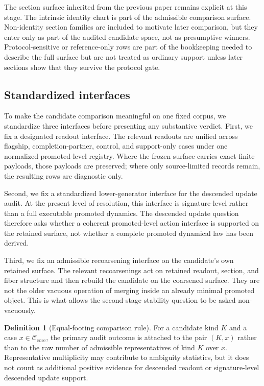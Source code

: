 \documentclass[11pt]{article}
\theoremstyle{definition}
\newtheorem{definition}[theorem]{Definition}
\begin{document}
The section surface inherited from the previous paper remains explicit at this stage. The intrinsic identity chart is part of the admissible comparison surface. Non-identity section families are included to motivate later comparison, but they enter only as part of the audited candidate space, not as presumptive winners. Protocol-sensitive or reference-only rows are part of the bookkeeping needed to describe the full surface but are not treated as ordinary support unless later sections show that they survive the protocol gate.

\subsection{Standardized interfaces}

To make the candidate comparison meaningful on one fixed corpus, we standardize three interfaces before presenting any substantive verdict. First, we fix a designated readout interface. The relevant readouts are unified across flagship, completion-partner, control, and support-only cases under one normalized promoted-level registry. Where the frozen surface carries exact-finite payloads, those payloads are preserved; where only source-limited records remain, the resulting rows are diagnostic only.

Second, we fix a standardized lower-generator interface for the descended update audit. At the present level of resolution, this interface is signature-level rather than a full executable promoted dynamics. The descended update question therefore asks whether a coherent promoted-level action interface is supported on the retained surface, not whether a complete promoted dynamical law has been derived.

Third, we fix an admissible recoarsening interface on the candidate's own retained surface. The relevant recoarsenings act on retained readout, section, and fiber structure and then rebuild the candidate on the coarsened surface. They are not the older vacuous operation of merging inside an already minimal promoted object. This is what allows the second-stage stability question to be asked non-vacuously.

\begin{definition}[Equal-footing comparison rule]
\label{def:equal-footing}
For a candidate kind $K$ and a case $x \in \mathcal C_{\mathrm{core}}$, the primary audit outcome is attached to the pair $(K,x)$ rather than to the raw number of admissible representatives of kind $K$ over $x$. Representative multiplicity may contribute to ambiguity statistics, but it does not count as additional positive evidence for descended readout or signature-level descended update support.
\end{definition}
\end{document}
